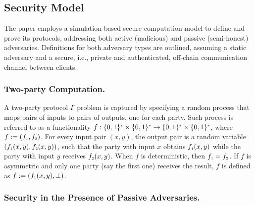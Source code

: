

 
  
\vspace{-4mm}
\subsection{Security Model}\label{sec::sec-model}
\vspace{-2mm}


The paper employs a simulation-based secure computation model \cite{DBLP:books/cu/Goldreich2004} to define and prove its protocols, addressing both active (malicious) and passive (semi-honest) adversaries. Definitions for both adversary types are outlined, assuming a static adversary and a secure, i.e., private and authenticated, off-chain communication channel between clients.


%
 
  \vspace{-4mm}
  
 \subsubsection{Two-party Computation.} A two-party protocol $\Gamma$ problem is captured by specifying a random process that maps pairs of inputs to pairs of outputs, one for each party. Such process is referred to as a functionality  $f:\{0,1\}^{\scriptscriptstyle *}\times\{0,1\}^{\scriptscriptstyle *}\rightarrow\{0,1\}^{\scriptscriptstyle *}\times\{0,1\}^{\scriptscriptstyle *}$, where $f:=(f_{\scriptscriptstyle 1},f_{\scriptscriptstyle 2})$. For every input pair $(x,y)$, the output pair is a random variable $(f_{\scriptscriptstyle 1} (x,y), f_{\scriptscriptstyle 2} (x,y))$, such that the party with input $x$ obtains $f_{\scriptscriptstyle 1} (x,y)$ while the party with input $y$ receives $f_{\scriptscriptstyle 2} (x,y)$. When $f$ is deterministic, then $f_{\scriptscriptstyle 1} =f_{\scriptscriptstyle 2}$. If $f$ is asymmetric and only one party (say the first one) receives the result, $f$ is defined as $f:=(f_{\scriptscriptstyle 1}(x,y), \bot)$. 
 
  
  \vspace{-3mm}
 \subsubsection{Security in the Presence of Passive Adversaries.} 
 
